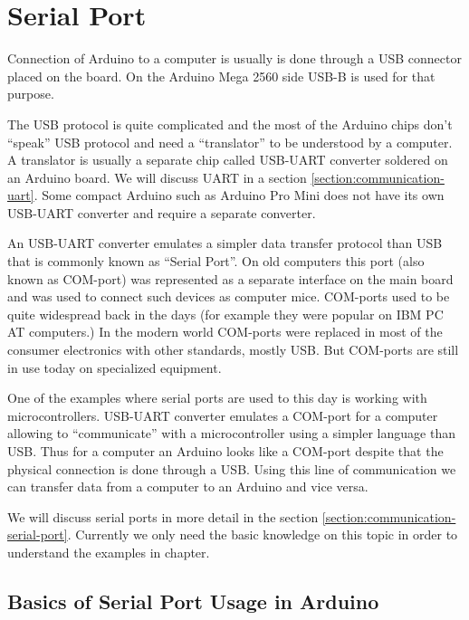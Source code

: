 \documentclass[../sparc.tex]{subfiles}
\begin{document}
\section{Serial Port}
\label{section:serial-port}

Connection of Arduino to a computer is usually is done through a USB connector
placed on the board.  On the Arduino Mega 2560 side USB-B is used for that
purpose.

The USB protocol is quite complicated and the most of the Arduino chips don't
``speak'' USB protocol and need a ``translator'' to be understood by a computer.
A translator is usually a separate chip called USB-UART converter soldered on an
Arduino board.  We will discuss UART in a section
\ref{section:communication-uart}.  Some compact Arduino such as Arduino Pro Mini
does not have its own USB-UART converter and require a separate converter.

An USB-UART converter emulates a simpler data transfer protocol than USB that is
commonly known as ``Serial Port''.  On old computers this port (also known as
COM-port) was represented as a separate interface on the main board and was used
to connect such devices as computer mice.  COM-ports used to be quite widespread
back in the days (for example they were popular on IBM PC AT computers.)  In the
modern world COM-ports were replaced in most of the consumer electronics with
other standards, mostly USB.  But COM-ports are still in use today on
specialized equipment.

One of the examples where serial ports are used to this day is working with
microcontrollers.  USB-UART converter emulates a COM-port for a computer
allowing to ``communicate'' with a microcontroller using a simpler language than
USB.  Thus for a computer an Arduino looks like a COM-port despite that the
physical connection is done through a USB.  Using this line of communication we
can transfer data from a computer to an Arduino and vice versa.

We will discuss serial ports in more detail in the section
\ref{section:communication-serial-port}.  Currently we only need the basic
knowledge on this topic in order to understand the examples in chapter.

\subsection{Basics of Serial Port Usage in Arduino}
\end{document}
